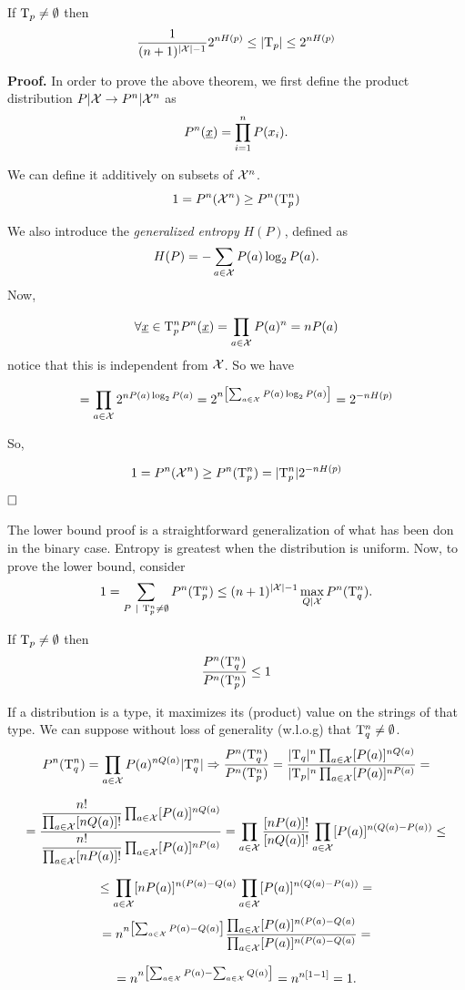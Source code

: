\begin{thm} \label{thms:taupcard}
	If $\mathrm{T}_p \not= \emptyset$ then $$\dfrac{1}{(n+1)^{|\mathcal{X}| -1}}2^{nH(p)}\leq |\mathrm{T}_p| \leq 2^{nH(p)}$$
\end{thm}

\noindent\textbf{Proof.} In order to prove the above theorem, we first define the product distribution $P|\mathcal{X} \rightarrow P^n|\mathcal{X}^n$ as 
\begin{equation}
	P^n(\underline{x}) = \prod_{i = 1}^nP(x_i).
\end{equation}

We can define it additively on subsets of $\mathcal{X}^n$.
\[
1 = P^n(\mathcal{X}^n) \geq P^n(\mathrm{T}_p^n)
\]

We also introduce the \emph{generalized entropy} $H(P)$, defined as $$H(P) = -\sum_{a \in \mathcal{X}} P(a)\log_2P(a).$$
Now,

\[
\forall \underline{x} \in \mathrm{T}_p^n P^n(\underline{x}) = \prod_{a \in \mathcal{X}}P(a)^n = nP(a)
\]
notice that this is independent from $\mathcal{X}$. So we have

\[ 
= \prod_{a \in \mathcal{X}} 2^{nP(a)\log_2P(a)} = 2^{n\left[\sum_{a \in \mathcal{X}} P(a)\log_2P(a)\right]} = 2^{-nH(p)}
\]

So,

\[1 = P^n(\mathcal{X}^n) \geq P^n(\mathrm{T}^n_p) = |\mathrm{T}_p^n|2^{-nH(p)} \] $\hfill\Box$

The lower bound proof is a straightforward generalization of what has been don in the binary case. Entropy is greatest when the distribution is uniform. Now, to prove the lower bound, consider
\[
1 = \sum_{P\ |\ \mathrm{T}_p^n \not= \emptyset}P^n(\mathrm{T}_p^n) \leq (n+1)^{|\mathcal{X}|-1} \max_{Q|\mathcal{X}}P^n(\mathrm{T}_q^n).
\]

\begin{obs}
If $\mathrm{T}_p \not= \emptyset$ then $$\dfrac{P^n(\mathrm{T}^n_q)}{P^n(\mathrm{T}^n_p)} \leq 1$$
\end{obs}

If a distribution is a type, it maximizes its (product) value on the strings of that type. We can suppose without loss of generality (w.l.o.g) that $\mathrm{T}^n_q \not= \emptyset$.
\[
P^n(\mathrm{T}_q^n) = \prod_{a \in \mathcal{X}} P(a)^{nQ(a)}|\mathrm{T}_q^n| \Rightarrow \dfrac{P^n(\mathrm{T}_q^n)}{P^n(\mathrm{T}_p^n)} = \dfrac{|\mathrm{T}_q|^n\prod_{a \in \mathcal{X}}[P(a)]^{nQ(a)}}{|\mathrm{T}_p|^n\prod_{a \in \mathcal{X}}[P(a)]^{nP(a)}} =
\]

\[
 = \dfrac{\dfrac{n!}{\prod_{a\in\mathcal{X}}[nQ(a)]!}\prod_{a\in\mathcal{X}}[P(a)]^{nQ(a)}}
 {\dfrac{n!}{\prod_{a\in\mathcal{X}}[nP(a)]!}\prod_{a\in\mathcal{X}}[P(a)]^{nP(a)}} = \prod_{a \in\mathcal{X}} \dfrac{[nP(a)]!}{[nQ(a)]!}\prod_{a\in\mathcal{X}}[P(a)]^{n(Q(a)-P(a))}\leq 
\]

\[
\leq \prod_{a \in \mathcal{X}} [nP(a)]^{n(P(a)-Q(a)}\prod_{a\in\mathcal{X}}[P(a)]^{n(Q(a)-P(a))} =
\]
\[
 = n^{n\left[\sum_{a \in \mathcal{X}}P(a) - Q(a)\right ]} \dfrac{\prod_{a \in \mathcal{X}}[P(a)]^{n(P(a)-Q(a)}}{\prod_{a \in \mathcal{X}}[P(a)]^{n(P(a)-Q(a)}} =
\]

\[ 
= n^{n\left [\sum_{a \in\mathcal{X}}P(a) -\sum_{a \in\mathcal{X}}Q(a) \right]} = n^{n[1-1]} = 1.
\]

